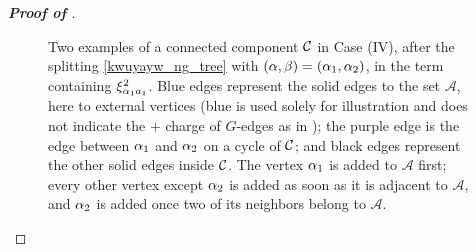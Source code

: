 \begin{proof}[\bf Proof of ]
\begin{figure}[h]
\begin{tikzpicture}[scale=2, every node/.style={circle, fill=black, inner sep=1.5pt}]
\end{tikzpicture}
\caption{Two examples of a connected component $\cal C$ in Case (IV), after the splitting \eqref{kwuyayw_ng_tree} with $(\al,\beta)=(\al_1,\al_2)$, in the term containing $\xi_{\al_1 a_1}^2$. Blue edges represent the solid edges to the set $\mathscr A$, here to external vertices (blue is used solely for illustration and does not indicate the $+$ charge of $G$-edges as in ); the purple edge is the edge between $\al_1$ and $\al_2$ on a cycle of $\cal C$; and black edges represent the other solid edges inside $\cal C$. The vertex $\al_1$ is added to $\mathscr A$ first; every other vertex except $\al_2$ is added as soon as it is adjacent to $\mathscr A$, and $\al_2$ is added once two of its neighbors belong to $\mathscr A$.}\label{Fig:construct_trees}
  \end{figure}

 \end{proof}





